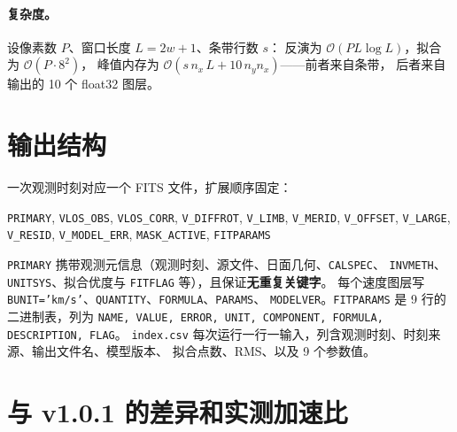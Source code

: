 \documentclass[11pt,a4paper]{ctexart}
\newcommand{\code}[1]{\texttt{\small #1}}
\begin{document}
\paragraph{复杂度。}
设像素数 $P$、窗口长度 $L=2w+1$、条带行数 $s$：
反演为 $\mathcal{O}(P L\log L)$，拟合为 $\mathcal{O}(P\cdot 8^2)$，
峰值内存为 $\mathcal{O}(s\,n_x\,L + 10\,n_y n_x)$——前者来自条带，
后者来自输出的 10 个 float32 图层。

\section{输出结构}

一次观测时刻对应一个 FITS 文件，扩展顺序固定：

\begin{center}
\code{PRIMARY}, \code{VLOS\_OBS}, \code{VLOS\_CORR}, \code{V\_DIFFROT},
\code{V\_LIMB}, \code{V\_MERID}, \code{V\_OFFSET}, \code{V\_LARGE},
\code{V\_RESID}, \code{V\_MODEL\_ERR}, \code{MASK\_ACTIVE}, \code{FITPARAMS}
\end{center}

\code{PRIMARY} 携带观测元信息（观测时刻、源文件、日面几何、\code{CALSPEC}、
\code{INVMETH}、\code{UNITSYS}、拟合优度与 \code{FITFLAG} 等），且保证\textbf{无重复关键字}。
每个速度图层写 \code{BUNIT='km/s'}、\code{QUANTITY}、\code{FORMULA}、\code{PARAMS}、
\code{MODELVER}。\code{FITPARAMS} 是 9 行的二进制表，列为
\code{NAME, VALUE, ERROR, UNIT, COMPONENT, FORMULA, DESCRIPTION, FLAG}。
\code{index.csv} 每次运行一行一输入，列含观测时刻、时刻来源、输出文件名、模型版本、
拟合点数、RMS、以及 9 个参数值。

\section{与 v1.0.1 的差异和实测加速比}
\label{sec:speed}
\end{document}
